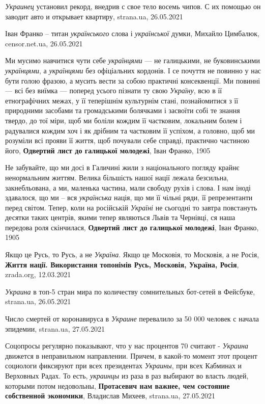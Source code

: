 \emph{Украинец} установил рекорд, внедрив с свое тело восемь чипов. С их помощью он
заводит авто и открывает квартиру, strana.ua, 26.05.2021

Іван Франко – титан \emph{українського} слова і \emph{української} думки,
Михайло Цимбалюк, censor.net.ua, 26.05.2021

Ми мусимо навчитися чути себе \emph{українцями} — не галицькими, не
буковинськими \emph{українцями}, а \emph{українцями} без офіціальних кордонів.
І се почуття не повинно у нас бути голою фразою, а мусить вести за собою
практичні консеквенції. Ми повинні — всі без виїмка — поперед усього пізнати ту
свою \emph{Україну}, всю в її етнографічних межах, у її теперішнім культурнім
стані, познайомитися з її природними засобами та громадськими болячками і
засвоїти собі те знання твердо, до тої міри, щоб ми боліли кождим її частковим,
локальним болем і радувалися кождим хоч і як дрібним та частковим її успіхом, а
головно, щоб ми розуміли всі прояви її життя, щоб почували себе справді,
практично частиною його, \textbf{Одвертий лист до галицької молодежі}, Іван
Франко, 1905

Не забувайте, що ми досі в Галичині жили з національного погляду крайнє
ненормальним життям. Велика більшість нашої нації лежала безсильна,
закнебльована, а ми, маленька частина, мали свободу рухів і слова. І нам іноді
здавалося, що ми – вся \emph{українська} нація, що ми її чільні ряди, її
репрезентанти перед світом. Тепер, коли на російській \emph{Україні} не
сьогодні то завтра повстануть десятки таких центрів, якими тепер являються
Львів та Чернівці, ся наша передова роля скінчилася, \textbf{Одвертий лист до
галицької молодежі}, Іван Франко, 1905

Якщо це Русь, то Русь, а не \emph{Україна}. Якщо це Московія, то Московія, а не
Росія, \textbf{Життя нації. Використання топонімів Русь, Московія, Україна,
Росія}, zrada.org, 12.03.2021

\emph{Украина} в топ-5 стран мира по количеству сомнительных бот-сетей в Фейсбуке, 
strana.ua, 26.05.2021

Число смертей от коронавируса в \emph{Украине} перевалило за 50 000 человек с начала
эпидемии, strana.ua, 27.05.2021

Соцопросы регулярно показывают, что у нас процентов 70 считают - \emph{Украина}
движется в неправильном направлении. Причем, в какой-то момент этот процент
социологи фиксируют при всех президентах \emph{Украины}, при всех Кабминах и Верховных
Радах. То есть, \emph{украинцы} из раза в раз выбирают во власть людей, которыми потом
недовольны, \textbf{Протасевич нам важнее, чем состояние собственной экономики}, Владислав Михеев, 
strana.ua, 27.05.2021

